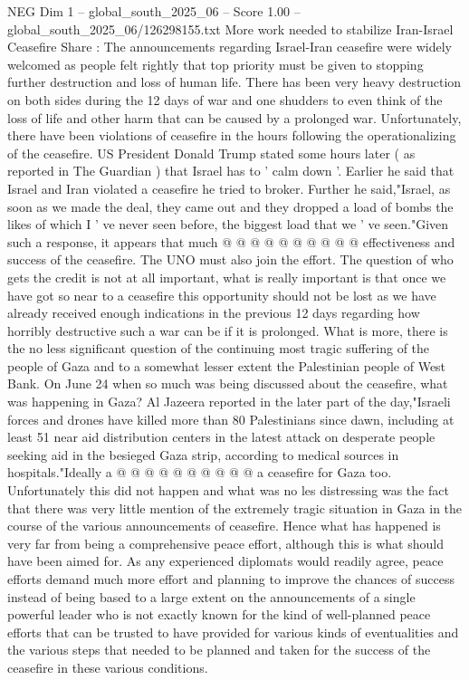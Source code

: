 \begin{textsample}{NEG Dim 1 – global\_south\_2025\_06 – Score 1.00 – global\_south\_2025\_06/126298155.txt}  \label{ex:f1_neg_238}
More work needed to stabilize Iran-Israel Ceasefire Share : The announcements regarding Israel-Iran ceasefire were widely welcomed as people felt rightly that top priority must be given to stopping further destruction and loss of human life.
There has been very heavy destruction on both sides during the 12 days of war and one shudders to even think of the loss of life and other harm that can be caused by a prolonged war.
Unfortunately, there have been violations of ceasefire in the hours following the operationalizing of the ceasefire.
US President Donald Trump stated some hours later ( as reported in The Guardian ) that Israel has to ' calm down '.
Earlier he said that Israel and Iran violated a ceasefire he tried to broker.
Further he said,"Israel, as soon as we made the deal, they came out and they dropped a load of bombs the likes of which I ' ve never seen before, the biggest load that we ' ve seen."Given such a response, it appears that much @ @ @ @ @ @ @ @ @ @ effectiveness and success of the ceasefire.
The UNO must also join the effort.
The question of who gets the credit is not at all important, what is really important is that once we have got so near to a ceasefire this opportunity should not be lost as we have already received enough indications in the previous 12 days regarding how horribly destructive such a war can be if it is prolonged.
What is more, there is the no less significant question of the continuing most tragic suffering of the people of Gaza and to a somewhat lesser extent the Palestinian people of West Bank.
On June 24 when so much was being discussed about the ceasefire, what was happening in Gaza?
Al Jazeera reported in the later part of the day,"Israeli forces and drones have killed more than 80 Palestinians since dawn, including at least 51 near aid distribution centers in the latest attack on desperate people seeking aid in the besieged Gaza strip, according to medical sources in hospitals."Ideally a @ @ @ @ @ @ @ @ @ @ a ceasefire for Gaza too.
Unfortunately this did not happen and what was no les distressing was the fact that there was very little mention of the extremely tragic situation in Gaza in the course of the various announcements of ceasefire.
Hence what has happened is very far from being a comprehensive peace effort, although this is what should have been aimed for.
As any experienced diplomats would readily agree, peace efforts demand much more effort and planning to improve the chances of success instead of being based to a large extent on the announcements of a single powerful leader who is not exactly known for the kind of well-planned peace efforts that can be trusted to have provided for various kinds of eventualities and the various steps that needed to be planned and taken for the success of the ceasefire in these various conditions.

\end{textsample}
